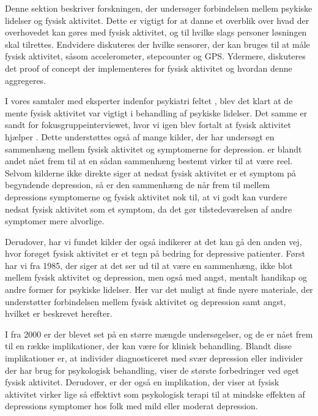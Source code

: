 Denne sektion beskriver forskningen, der undersøger forbindelsen mellem psykiske lidelser og fysisk aktivitet. 
Dette er vigtigt for at danne et overblik over hvad der overhovedet kan gøres med fysisk aktivitet, og til hvilke slags personer løsningen skal tilrettes.
Endvidere diskuteres der hvilke sensorer, der kan bruges til at måle fysisk aktivitet, såsom accelerometer, stepcounter og GPS.
Ydermere, diskuteres det proof of concept der implementeres for fysisk aktivitet og hvordan denne aggregeres. 

I vores samtaler med eksperter indenfor psykiatri feltet \citep[Kapitel 1, Sektion 3 og 4]{misc:faellesrapp}, blev det klart at de mente fysisk aktivitet var vigtigt i behandling af psykiske lidelser.
Det samme er sandt for fokusgruppeinterviewet, hvor vi igen blev fortalt at fysisk aktivitet hjælper \citep[Kapitel 1, Sektion 5]{misc:faellesrapp}.
Dette understøttes også af mange kilder, der har undersøgt en sammenhæng mellem fysisk aktivitet og symptomerne for depression. \citet{art:physDepSymptoms, Strawbridge15082002, Arredondo01072012} er blandt andet nået frem til at en sådan sammenhæng bestemt virker til at være reel.
Selvom kilderne ikke direkte siger at nedsat fysisk aktivitet er et symptom på begyndende depression, så er den sammenhæng de når frem til mellem depressions symptomerne og fysisk aktivitet nok til, at vi godt kan vurdere nedsat fysisk aktivitet som et symptom, da det gør tilstedeværelsen af andre symptomer mere alvorlige.

Derudover, har vi fundet kilder der også indikerer at det kan gå den anden vej, hvor forøget fysisk aktivitet er et tegn på bedring for depressive patienter.
Først har vi \citet{misc:healthReports} fra 1985, der siger at det ser ud til at være en sammenhæng, ikke blot mellem fysisk aktivitet og depression, men også med angst, mentalt handikap og andre former for psykiske lidelser.
Her var det muligt at finde nyere materiale, der understøtter forbindelsen mellem fysisk aktivitet og depression samt angst, hvilket er beskrevet herefter.

I \citet{art:physMental} fra 2000 er der blevet set på en større mængde undersøgelser, og de er nået frem til en række implikationer, der kan være for klinisk behandling.
Blandt disse implikationer er, at individer diagnosticeret med svær depression eller individer der har brug for psykologisk behandling, viser de største forbedringer ved øget fysisk aktivitet.
Derudover, er der også en implikation, der viser at fysisk aktivitet virker lige så effektivt som psykologisk terapi til at mindske effekten af depressions symptomer hos folk med mild eller moderat depression.

